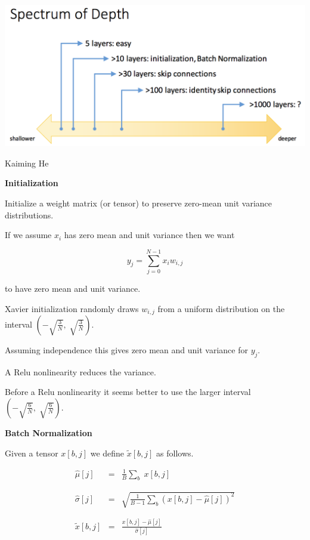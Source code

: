 {

\centerline{\includegraphics[width = 9in]{../images/DepthSpectrum}}

\centerline{\large Kaiming He}

\slide{}
\centerline{\bf Initialization}
\vfill


Initialize a weight matrix (or tensor) to preserve zero-mean unit variance distributions.

\vfill
If we assume $x_i$ has zero mean and unit variance then we want

\vfill
$$y_j = \sum_{j=0}^{N-1} x_i w_{i,j}$$

\vfill
to have zero mean and unit variance.

\vfill
Xavier initialization randomly draws $w_{i,j}$ from a uniform distribution on the interval $\left(-\sqrt{\frac{3}{N}},\;\sqrt{\frac{3}{N}}\right)$.

\vfill
Assuming independence this gives zero mean and unit variance for $y_j$.


A Relu nonlinearity reduces the variance.

\vfill
Before a Relu nonlinearity it seems better to use the larger interval $\left(-\sqrt{\frac{6}{N}},\;\sqrt{\frac{6}{N}}\right)$.

\slide{}
\centerline{\bf Batch Normalization}
\vfill

Given a tensor $x[b,j]$ we define $\tilde{x}[b,j]$ as follows.

\begin{eqnarray*}
  \hat{\mu}[j] & = & \frac{1}{B} \sum_b\;x[b,j] \\
  \\
  \\
  \hat{\sigma}[j] & = & \sqrt{\frac{1}{B-1} \sum_b (x[b,j]-\hat{\mu}[j])^2} \\
  \\
  \\
  \tilde{x}[b,j]& = & \frac{x[b,j] - \hat{\mu}[j]}{\hat{\sigma}[j]}
\end{eqnarray*}


}
